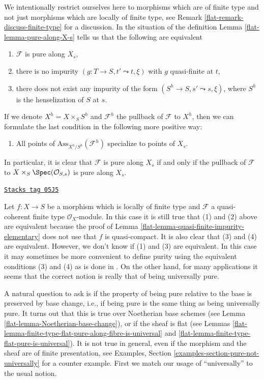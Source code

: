 We intentionally restrict ourselves here to morphisms which are
of finite type and not just morphisms which are locally of
finite type, see
Remark \ref{flat-remark-discuss-finite-type}
for a discussion. In the situation of the definition
Lemma \ref{flat-lemma-pure-along-X-s}
tells us that the following are equivalent
\begin{enumerate}
\item $\mathcal{F}$ is pure along $X_s$,
\item there is no impurity $(g : T \to S, t' \leadsto t, \xi)$ with $g$
quasi-finite at $t$,
\item there does not exist any impurity of the form
$(S^h \to S, s' \leadsto s, \xi)$, where $S^h$ is the henselization
of $S$ at $s$.
\end{enumerate}
If we denote $X^h = X \times_S S^h$ and $\mathcal{F}^h$ the pullback
of $\mathcal{F}$ to $X^h$, then we can formulate the last condition
in the following more positive way:
\begin{enumerate}
\item[(4)] All points of $\text{Ass}_{X^h/S^h}(\mathcal{F}^h)$ specialize
to points of $X_s$.
\end{enumerate}
In particular, it is clear that $\mathcal{F}$ is pure along $X_s$
if and only if the pullback of $\mathcal{F}$ to
$X \times_S \Spec(\mathcal{O}_{S, s})$ is pure along $X_s$.

\begin{remark}
\label{flat-remark-discuss-finite-type}
\href{https://stacks.math.columbia.edu/tag/05J5}{\texttt{Stacks tag 05J5}}

Let $f : X \to S$ be a morphism which is locally of finite type
and $\mathcal{F}$ a quasi-coherent finite type $\mathcal{O}_X$-module.
In this case it is still true that (1) and (2) above are equivalent
because the proof of
Lemma \ref{flat-lemma-quasi-finite-impurity-elementary}
does not use that $f$ is quasi-compact. It is also clear that
(3) and (4) are equivalent. However, we don't know if (1) and (3) are
equivalent. In this case it may sometimes be more convenient to define
purity using the equivalent conditions (3) and (4) as is done in \cite{GruRay}.
On the other hand, for many applications it seems that the correct notion
is really that of being universally pure.
\end{remark}

A natural question to ask is if the property of being pure relative to
the base is preserved by base change, i.e., if being pure is the same
thing as being universally pure. It turns out that this is true
over Noetherian base schemes (see
Lemma \ref{flat-lemma-Noetherian-base-change}),
or if the sheaf is flat (see
Lemmas \ref{flat-lemma-finite-type-flat-pure-along-fibre-is-universal} and
\ref{flat-lemma-finite-type-flat-pure-is-universal}).
It is not true in general, even if the morphism and the sheaf are of
finite presentation, see
Examples, Section \ref{examples-section-pure-not-universally}
for a counter example. First we match our usage of ``universally''
to the usual notion.

